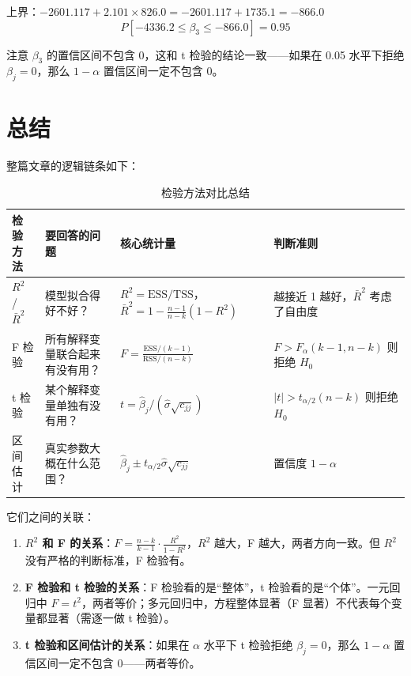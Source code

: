 \documentclass[12pt,a4paper]{ctexart}
\begin{document}
上界：\(-2601.117 + 2.101 \times 826.0 = -2601.117 + 1735.1 = -866.0\)
\[
P[-4336.2 \leq \beta_3 \leq -866.0] = 0.95
\]

注意 \(\beta_3\) 的置信区间不包含 0，这和 t 检验的结论一致——如果在 0.05 水平下拒绝 \(\beta_j = 0\)，那么 \(1-\alpha\) 置信区间一定不包含 0。

\section{总结}

整篇文章的逻辑链条如下：

\begin{table}[htbp]
\centering
\caption{检验方法对比总结}
\begin{tabular}{p{2.5cm}p{3.5cm}p{4.5cm}p{4cm}}
\toprule
\textbf{检验方法} & \textbf{要回答的问题} & \textbf{核心统计量} & \textbf{判断准则} \\
\midrule
\(R^2\) / \(\bar{R}^2\) & 模型拟合得好不好？ & \(R^2 = \text{ESS}/\text{TSS}\)，\(\bar{R}^2 = 1 - \frac{n-1}{n-k}(1-R^2)\) & 越接近 1 越好，\(\bar{R}^2\) 考虑了自由度 \\
F 检验 & 所有解释变量联合起来有没有用？ & \(F = \frac{\text{ESS}/(k-1)}{\text{RSS}/(n-k)}\) & \(F > F_\alpha(k-1, n-k)\) 则拒绝 \(H_0\) \\
t 检验 & 某个解释变量单独有没有用？ & \(t = \hat{\beta}_j / (\hat{\sigma}\sqrt{c_{jj}})\) & \(|t| > t_{\alpha/2}(n-k)\) 则拒绝 \(H_0\) \\
区间估计 & 真实参数大概在什么范围？ & \(\hat{\beta}_j \pm t_{\alpha/2}\hat{\sigma}\sqrt{c_{jj}}\) & 置信度 \(1-\alpha\) \\
\bottomrule
\end{tabular}
\end{table}

它们之间的关联：
\begin{enumerate}
    \item \textbf{\(R^2\) 和 F 的关系}：\(F = \frac{n-k}{k-1} \cdot \frac{R^2}{1-R^2}\)，\(R^2\) 越大，F 越大，两者方向一致。但 \(R^2\) 没有严格的判断标准，F 检验有。
    \item \textbf{F 检验和 t 检验的关系}：F 检验看的是“整体”，t 检验看的是“个体”。一元回归中 \(F = t^2\)，两者等价；多元回归中，方程整体显著（F 显著）不代表每个变量都显著（需逐一做 t 检验）。
    \item \textbf{t 检验和区间估计的关系}：如果在 \(\alpha\) 水平下 t 检验拒绝 \(\beta_j = 0\)，那么 \(1-\alpha\) 置信区间一定不包含 0——两者等价。
\end{enumerate}
\end{document}

